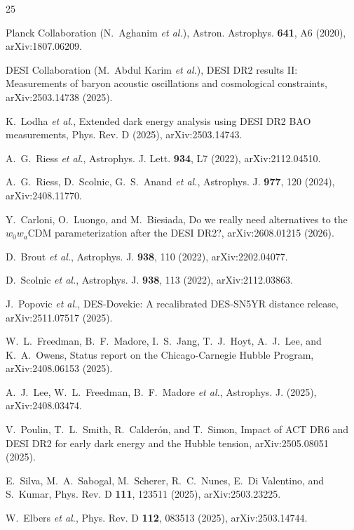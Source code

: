 \documentclass[aps,prd,twocolumn,superscriptaddress,nofootinbib]{revtex4-2}
\begin{document}
\begin{thebibliography}{25}

Planck Collaboration (N.~Aghanim \emph{et al.}), Astron. Astrophys. \textbf{641}, A6 (2020), arXiv:1807.06209.

DESI Collaboration (M.~Abdul Karim \emph{et al.}), DESI DR2 results II: Measurements of baryon acoustic oscillations and cosmological constraints, arXiv:2503.14738 (2025).

K.~Lodha \emph{et al.}, Extended dark energy analysis using DESI DR2 BAO measurements, Phys. Rev. D (2025), arXiv:2503.14743.

A.~G.~Riess \emph{et al.}, Astrophys. J. Lett. \textbf{934}, L7 (2022), arXiv:2112.04510.

A.~G.~Riess, D.~Scolnic, G.~S.~Anand \emph{et al.}, Astrophys. J. \textbf{977}, 120 (2024), arXiv:2408.11770.

Y.~Carloni, O.~Luongo, and M.~Biesiada, Do we really need alternatives to the $w_0 w_a$CDM parameterization after the DESI DR2?, arXiv:2608.01215 (2026).

D.~Brout \emph{et al.}, Astrophys. J. \textbf{938}, 110 (2022), arXiv:2202.04077.

D.~Scolnic \emph{et al.}, Astrophys. J. \textbf{938}, 113 (2022), arXiv:2112.03863.

J.~Popovic \emph{et al.}, DES-Dovekie: A recalibrated DES-SN5YR distance release, arXiv:2511.07517 (2025).

W.~L.~Freedman, B.~F.~Madore, I.~S.~Jang, T.~J.~Hoyt, A.~J.~Lee, and K.~A.~Owens, Status report on the Chicago-Carnegie Hubble Program, arXiv:2408.06153 (2025).

A.~J.~Lee, W.~L.~Freedman, B.~F.~Madore \emph{et al.}, Astrophys. J. (2025), arXiv:2408.03474.

V.~Poulin, T.~L.~Smith, R.~Calder\'on, and T.~Simon, Impact of ACT DR6 and DESI DR2 for early dark energy and the Hubble tension, arXiv:2505.08051 (2025).

E.~Silva, M.~A.~Sabogal, M.~Scherer, R.~C.~Nunes, E.~Di Valentino, and S.~Kumar, Phys. Rev. D \textbf{111}, 123511 (2025), arXiv:2503.23225.

W.~Elbers \emph{et al.}, Phys. Rev. D \textbf{112}, 083513 (2025), arXiv:2503.14744.


\end{thebibliography}
\end{document}
